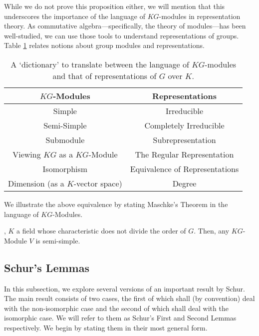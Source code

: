 While we do not prove this proposition either, we will mention that this underscores the importance of the language of $KG$-modules in representation theory. As commutative algebra---specifically, the theory of modules---has been well-studied, we can use those tools to understand representations of groups. Table \ref{Ch1:Tab:Module_Rep_Dictionary} relates notions about group modules and representations.

\begin{table}[!h]
    \centering
    \begin{tabular}{c|c}
        \textbf{$KG$-Modules} & \textbf{Representations} \\ \hline
        Simple & Irreducible \\
        Semi-Simple & Completely Irreducible \\
        Submodule & Subrepresentation \\
        Viewing $KG$ as a $KG$-Module & The Regular Representation \\
        Isomorphism & Equivalence of Representations \\
        Dimension (as a $K$-vector space) & Degree
    \end{tabular}
    \caption{\centering A `dictionary' to translate between the language of $KG$-modules and that of representations of $G$ over $K$.}
    \label{Ch1:Tab:Module_Rep_Dictionary}
\end{table}

We illustrate the above equivalence by stating Maschke's Theorem in the language of $KG$-Modules.

\begin{lemma}
    , $K$ a field whose characteristic does not divide the order of $G$. Then, any $KG$-Module $V$ is semi-simple.
\end{lemma}

\subsection{Schur's Lemmas}

In this subsection, we explore several versions of an important result by Schur. The main result consists of two cases, the first of which shall (by convention) deal with the non-isomorphic case and the second of which shall deal with the isomorphic case. We will refer to them as Schur's First and Second Lemmas respectively. We begin by stating them in their most general form.

